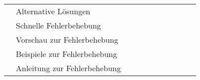 \begin{table}[htp]
\begin{tabular}{lllllllllll}
                                                                                  & Alternative Lösungen                                                                                          &                             &                            &                            &                                  &                      &                         &                                         &                           &                                        \\
                                                                                  & Schnelle Fehlerbehebung                                                                                       &                             &                            &                            &                                  &                      &                         &                                         &                           &                                        \\
                                                                                  & Vorschau zur Fehlerbehebung                                                                                   &                             &                            &                            &                                  &                      &                         &                                         &                           &                                        \\
                                                                                  & Beispiele zur Fehlerbehebung                                                                                  &                             &                            &                            &                                  &                      &                         &                                         &                           &                                        \\
                                                                                  & Anleitung zur Fehlerbehebung                                                                                  &                             &                            &                            &                                  &                      &                         &                                         &                           &                                        \\

\end{tabular}
\end{table}
